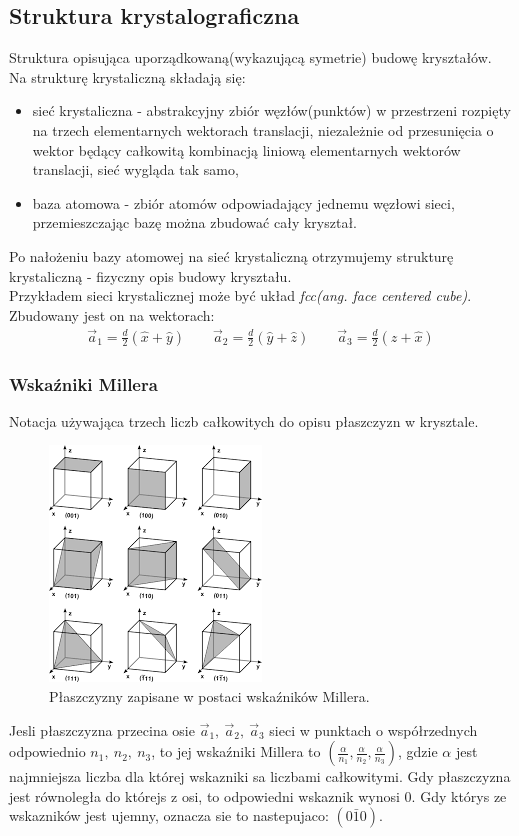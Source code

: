 \documentclass[paper=a4, fontsize=12pt]{scrartcl}
\begin{document}
\subsection{Struktura krystalograficzna}
Struktura opisująca uporządkowaną(wykazującą symetrie) budowę kryształów.\\
Na strukturę krystaliczną składają się:
\begin{itemize}
	\item sieć krystaliczna - abstrakcyjny zbiór węzłów(punktów) w przestrzeni rozpięty na trzech elementarnych wektorach translacji, niezależnie od przesunięcia o wektor będący całkowitą kombinacją liniową elementarnych wektorów translacji, sieć wygląda tak samo,
	\item baza atomowa - zbiór atomów odpowiadający jednemu węzłowi sieci, przemieszczając bazę można zbudować cały kryształ.
\end{itemize}
Po nałożeniu bazy atomowej na sieć krystaliczną otrzymujemy strukturę krystaliczną - fizyczny opis budowy kryształu.\\
Przykładem sieci krystalicznej może być układ \textit{fcc(ang. face centered cube)}. Zbudowany jest on na wektorach:
\begin{align*}
\vec{a}_1=\frac{d}{2}(\hat{x}+\hat{y})\qquad\vec{a}_2=\frac{d}{2}(\hat{y}+\hat{z})\qquad\vec{a}_3=\frac{d}{2}(\hat{z}+\hat{x})
\end{align*}
\subsubsection{Wskaźniki Millera}
Notacja używająca trzech liczb całkowitych do opisu płaszczyzn w krysztale.
\begin{figure}[h]
\centering
\includegraphics[width=0.5\linewidth]{miller}
\caption{Płaszczyzny zapisane w postaci wskaźników Millera.}
\label{fig:miller}
\end{figure}
Jesli płaszczyzna przecina osie $\vec{a}_1,\:\vec{a}_2,\:\vec{a}_3$ sieci w punktach o współrzednych odpowiednio $n_1,\: n_2,\: n_3$, to jej wskaźniki Millera to $\left(\frac{\alpha}{n_1},\frac{\alpha}{n_2},\frac{\alpha}{n_3}\right)$, gdzie $\alpha$ jest najmniejsza liczba dla której wskazniki sa liczbami
całkowitymi. Gdy płaszczyzna jest równoległa do którejs z osi, to odpowiedni wskaznik
wynosi $0$. Gdy którys ze wskazników jest ujemny, oznacza sie to nastepujaco: $(0\bar{1}0)$.
\end{document}
